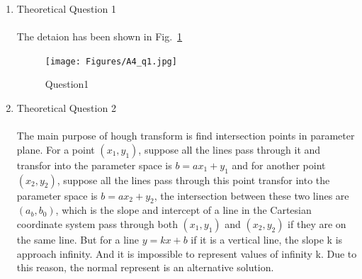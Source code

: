 \documentclass[12pt]{article}
\begin{document}
\begin{enumerate}[1]
\item Theoretical Question 1\\
\\
The detaion has been shown in Fig.~\ref{A4_q1}
    \begin{figure}[H]
        \centering
        \texttt{[image: Figures/A4\_q1.jpg]}
        \caption{Question1}
        \label{A4_q1}
    \end{figure}

\item Theoretical Question 2\\
\\
The main purpose of hough transform is find intersection points in parameter plane. 
For a point $(x_1, y_1)$,  suppose all the lines pass through it and transfor into the parameter space is $b = ax_1 + y_1$ and for another point $(x_2, y_2)$, suppose all the lines pass through this point transfor into the parameter space is $b = ax_2 + y_2$, the intersection between these two lines are $(a_b, b_0)$, which is the slope and intercept of a line in the Cartesian coordinate system pass through both $(x_1, y_1)$ and $(x_2, y_2)$ if they are on the same line. 
But for a line $y = kx +b$ if it is a vertical line, the slope k is approach infinity. 
And it is impossible to represent values of infinity k. 
Due to this reason, the normal represent is an alternative solution.


\end{enumerate}
\end{document}
